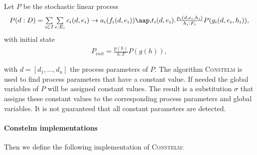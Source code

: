                       

Let $P$ be the stochastic linear process%
\[
\begin{array}{l}
P(d:D)=\sum\limits_{i\in I}\sum\limits_{e:E_{i}}c_{i}(d,e_{i})\rightarrow
a_{i}(f_{i}(d,e_{i}))\at t_{i}(d,e_{i}).\frac{p_{i}(d,e_{i},h_{i})}{%
h_{i}:F_{i}}P(g_{i}(d,e_{i},h_{i})),%
\end{array}%
\]%
with initial state%
\[
\begin{array}{l}
P_{init}=\frac{p(h)}{h:F}P(g(h)),%
\end{array}%
\]

with $d=[d_{1},\ldots ,d_{n}]$ the process parameters of $P$. The algorithm 
\textsc{Constelm} is used to find process parameters that have a constant
value. If needed the global variables of $P$ will be assigned constant
values. The result is a substitution $\sigma $ that assigns these constant
values to the corresponding process parameters and global variables. It is
not guaranteed that all constant parameters are detected.

\paragraph{Constelm implementations}

Then we define the following implementation of \textsc{Constelm}:

